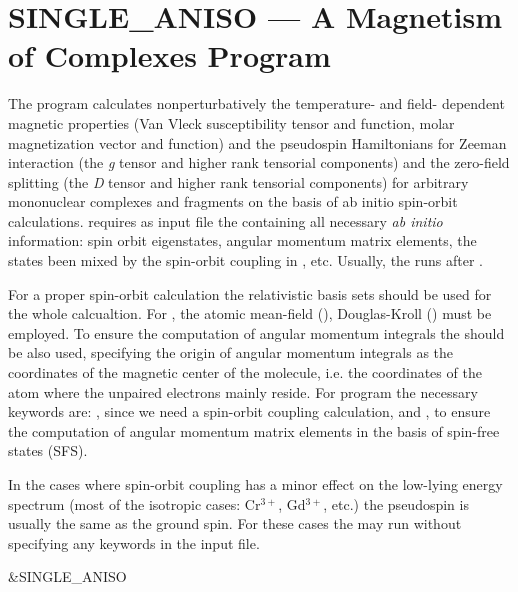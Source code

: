 \section{SINGLE\_ANISO --- A Magnetism of Complexes Program}
\label{TUT:sec:single_aniso}

The program  calculates nonperturbatively the temperature- and field- dependent magnetic 
properties (Van Vleck susceptibility tensor and function, molar magnetization vector and function) and the 
pseudospin Hamiltonians for Zeeman interaction (the {\it g} tensor and higher rank tensorial components) and the 
zero-field splitting (the \textit{D} tensor and higher rank tensorial components) for arbitrary mononuclear complexes 
and fragments on the basis of ab initio spin-orbit calculations.
 requires as input file the  containing all necessary 
{\it ab initio} information: spin orbit eigenstates, angular momentum matrix elements, the states been mixed 
by the spin-orbit coupling in , etc.  Usually, the  
runs after .

For a proper spin-orbit calculation the relativistic basis sets should be used for the whole calcualtion. 
For , the atomic mean-field (), Douglas-Kroll () must be employed.
To ensure the computation of angular momentum integrals the  should be also used, specifying the origin
of angular momentum integrals as the coordinates of the magnetic center of the molecule, i.e. the coordinates of the atom
where the unpaired electrons mainly reside.  For program  the necessary keywords are: ,
since we need a spin-orbit coupling calculation, and , to ensure the computation of angular momentum 
matrix elements in the basis of spin-free states (SFS).

In the cases where spin-orbit coupling has a minor effect on the low-lying energy spectrum (most of the 
isotropic cases: Cr$^{3+}$, Gd$^{3+}$, etc.) the pseudospin is usually the same as the ground spin. For these cases
the  may run without specifying any keywords in the input file.

\begin{inputlisting}
 &SINGLE_ANISO
\end{inputlisting}

